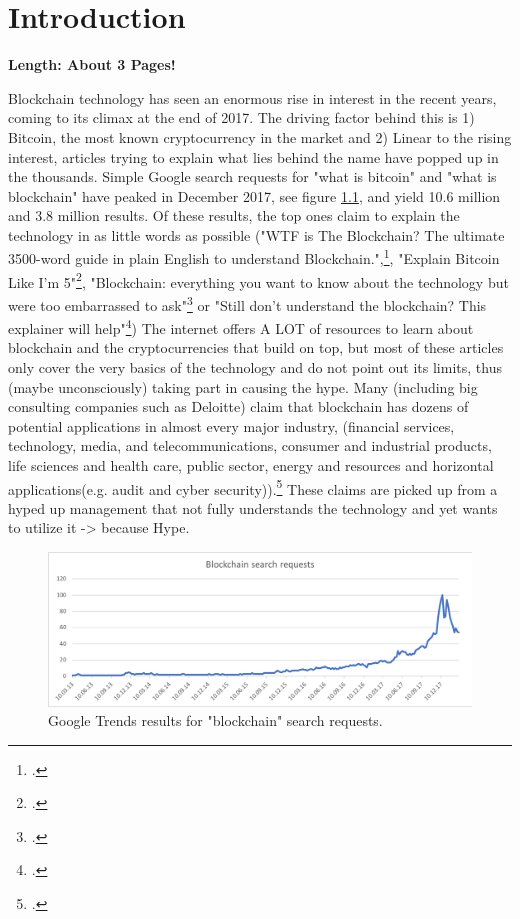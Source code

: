 \chapter{Introduction}
\label{chapter:Intro}

\textbf{Length: About 3 Pages!}

Blockchain technology has seen an enormous rise in interest in the recent years, coming to its climax at the end of 2017. The driving factor behind this is 1) Bitcoin, the most known cryptocurrency in the market and 2) 
Linear to the rising interest, articles trying to explain what lies behind the name have popped up in the thousands. Simple Google search requests for "what is bitcoin" and "what is blockchain" have peaked in December 2017, see figure \ref{fig:SearchRequests}, and yield 10.6 million and 3.8 million results. Of these results, the top ones claim to explain the technology in as little words as possible ("WTF is The Blockchain?
The ultimate 3500-word guide in plain English to understand Blockchain.",\footcite{MamoriaWTFBlockchain2017}, "Explain Bitcoin Like I'm 5"\footcite{CustodioExplainBitcoinFive2013}, "Blockchain: everything you want to know about the technology but were too embarrassed to ask"\footcite{HeathmannBlockchaineverythingyou2018} or "Still don't understand the blockchain? This explainer will help"\footcite{LeighSinodStilldonunderstand2018}) The internet offers A LOT of resources to learn about blockchain and the cryptocurrencies that build on top, but most of these articles only cover the very basics of the technology and do not point out its limits, thus (maybe unconsciously) taking part in causing the hype. Many (including big consulting companies such as Deloitte) claim that blockchain has dozens of potential applications in almost every major industry, (financial services, technology, media, and telecommunications, consumer and industrial products, life sciences and health care, public sector, energy and resources and horizontal applications(e.g. audit and cyber security)).\footcite{SchatskybitcoinBlockchaincoming2015} These claims are picked up from a hyped up management that not fully understands the technology and yet wants to utilize it -> because Hype.

\begin{figure}
    \centering
    \includegraphics[width=\textwidth]{latex-vorlage_v1.5/graphics/BCRQ.png}
    \caption[Google Trends results for "blockchain" search requests.]{Google Trends results for "blockchain" search requests.\footnotemark}
    \label{fig:SearchRequests}
\end{figure}

